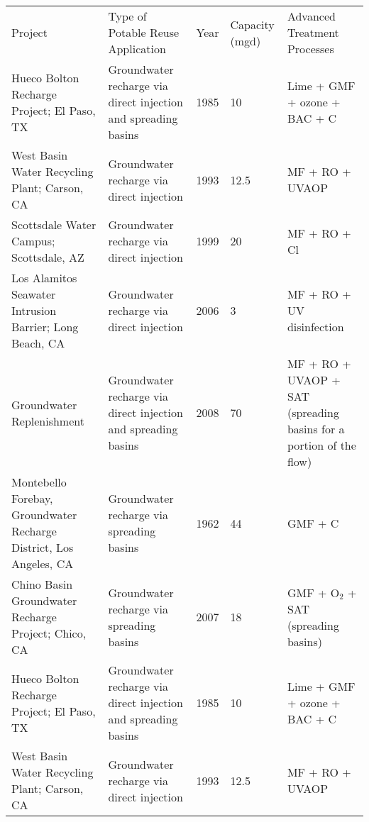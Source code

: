 \begin{table}[]
\begin{tabular}{lllll}
Project                                                            & Type of Potable Reuse Application                              & Year & Capacity (mgd) & Advanced Treatment Processes                                       \\
Hueco Bolton Recharge Project; El Paso, TX                         & Groundwater recharge via direct injection and spreading basins & 1985 & 10             & Lime + GMF + ozone + BAC + C                                       \\
West Basin Water Recycling Plant; Carson, CA                       & Groundwater recharge via direct injection                      & 1993 & 12.5           & MF + RO + UVAOP                                                    \\
Scottsdale Water Campus; Scottsdale, AZ                            & Groundwater recharge via direct injection                      & 1999 & 20             & MF + RO + Cl                                                      \\
Los Alamitos Seawater Intrusion Barrier; Long Beach, CA            & Groundwater recharge via direct injection                      & 2006 & 3              & MF + RO + UV disinfection                                          \\
Groundwater Replenishment                                          & Groundwater recharge via direct injection and spreading basins & 2008 & 70             & MF + RO + UVAOP + SAT (spreading basins for a portion of the flow) \\
Montebello Forebay, Groundwater Recharge District, Los Angeles, CA & Groundwater recharge via spreading basins                      & 1962 & 44             & GMF + C                                                            \\
Chino Basin Groundwater Recharge Project; Chico, CA                & Groundwater recharge via spreading basins                      & 2007 & 18             & GMF + O$_2$ + SAT (spreading basins)                                 
\\
Hueco Bolton Recharge Project; El Paso, TX                         & Groundwater recharge via direct injection and spreading basins & 1985 & 10             & Lime + GMF + ozone + BAC + C                                       \\
West Basin Water Recycling Plant; Carson, CA                       & Groundwater recharge via direct injection                      & 1993 & 12.5           & MF + RO + UVAOP                                                    \\

\end{tabular}
\end{table}
